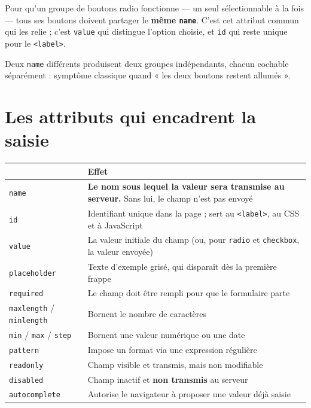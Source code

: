 \documentclass[a4paper,11pt]{article}
\newcommand{\hdr}[1]{\multicolumn{1}{l}{\color{white}\bfseries #1}}
\renewcommand{\arraystretch}{1.3}
\begin{document}
\begin{tcolorbox}[attention, title={La règle des boutons radio}]
Pour qu'un groupe de boutons radio fonctionne --- un seul sélectionnable à la fois --- tous ses boutons doivent partager le \textbf{même \texttt{name}}. C'est cet attribut commun qui les relie ; c'est \texttt{value} qui distingue l'option choisie, et \texttt{id} qui reste unique pour le \texttt{<label>}.

\vspace{3pt}
Deux \texttt{name} différents produisent deux groupes indépendants, chacun cochable séparément : symptôme classique quand « les deux boutons restent allumés ».
\end{tcolorbox}

\section{Les attributs qui encadrent la saisie}

\begin{center}
\renewcommand{\arraystretch}{1.0}
\begin{tabularx}{\linewidth}{p{3.2cm}X}
  \toprule
  \rowcolor{uniNavy}
  \hdr{Attribut} & \hdr{Effet} \\
  \midrule
  \rowcolor{uniPaper}
  \texttt{name} & \textbf{Le nom sous lequel la valeur sera transmise au serveur.} Sans lui, le champ n'est pas envoyé \\
  \texttt{id} & Identifiant unique dans la page ; sert au \texttt{<label>}, au CSS et à JavaScript \\
  \rowcolor{uniPaper}
  \texttt{value} & La valeur initiale du champ (ou, pour \texttt{radio} et \texttt{checkbox}, la valeur envoyée) \\
  \texttt{placeholder} & Texte d'exemple grisé, qui disparaît dès la première frappe \\
  \rowcolor{uniPaper}
  \texttt{required} & Le champ doit être rempli pour que le formulaire parte \\
  \texttt{maxlength} / \texttt{minlength} & Bornent le nombre de caractères \\
  \rowcolor{uniPaper}
  \texttt{min} / \texttt{max} / \texttt{step} & Bornent une valeur numérique ou une date \\
  \texttt{pattern} & Impose un format via une expression régulière \\
  \rowcolor{uniPaper}
  \texttt{readonly} & Champ visible et transmis, mais non modifiable \\
  \texttt{disabled} & Champ inactif et \textbf{non transmis} au serveur \\
  \rowcolor{uniPaper}
  \texttt{autocomplete} & Autorise le navigateur à proposer une valeur déjà saisie \\
  \bottomrule
\end{tabularx}
\end{center}
\end{document}
